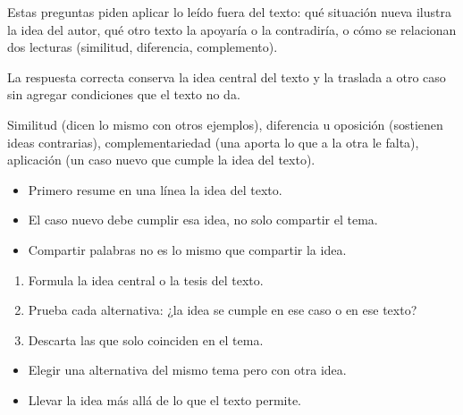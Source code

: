 \documentclass[10pt,a4paper,twocolumn]{article}
\begin{document}
Estas preguntas piden aplicar lo leído fuera del texto: qué situación nueva ilustra la idea del autor, qué otro texto la apoyaría o la contradiría, o cómo se relacionan dos lecturas (similitud, diferencia, complemento).

La respuesta correcta conserva la idea central del texto y la traslada a otro caso sin agregar condiciones que el texto no da.

\begin{definicion}
Similitud (dicen lo mismo con otros ejemplos), diferencia u oposición (sostienen ideas contrarias), complementariedad (una aporta lo que a la otra le falta), aplicación (un caso nuevo que cumple la idea del texto).
\end{definicion}

\begin{ideasclave}
\begin{itemize}
  \item Primero resume en una línea la idea del texto.
  \item El caso nuevo debe cumplir esa idea, no solo compartir el tema.
  \item Compartir palabras no es lo mismo que compartir la idea.
\end{itemize}
\end{ideasclave}

\begin{metodo}
\begin{enumerate}
  \item Formula la idea central o la tesis del texto.
  \item Prueba cada alternativa: ¿la idea se cumple en ese caso o en ese texto?
  \item Descarta las que solo coinciden en el tema.
\end{enumerate}
\end{metodo}

\begin{errorfrecuente}
\begin{itemize}
  \item Elegir una alternativa del mismo tema pero con otra idea.
  \item Llevar la idea más allá de lo que el texto permite.
\end{itemize}
\end{errorfrecuente}
\end{document}
